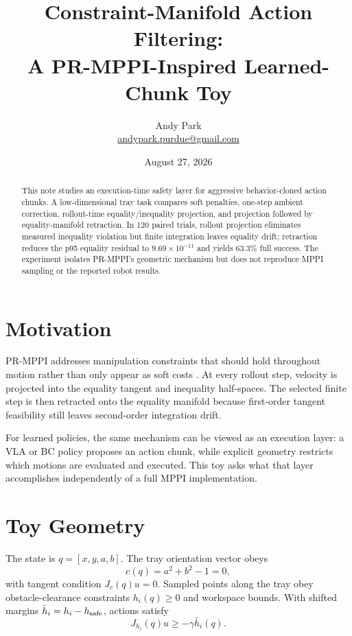 \documentclass[11pt]{article}
\title{Constraint-Manifold Action Filtering:\\A PR-MPPI-Inspired Learned-Chunk Toy}
\author{Andy Park\\\href{mailto:andypark.purdue@gmail.com}{andypark.purdue@gmail.com}}
\date{August 27, 2026}
\begin{document}
\maketitle
\begin{abstract}
This note studies an execution-time safety layer for aggressive behavior-cloned action chunks. A low-dimensional tray task compares soft penalties, one-step ambient correction, rollout-time equality/inequality projection, and projection followed by equality-manifold retraction. In 120 paired trials, rollout projection eliminates measured inequality violation but finite integration leaves equality drift; retraction reduces the p95 equality residual to $9.69\times10^{-11}$ and yields 63.3\% full success. The experiment isolates PR-MPPI's geometric mechanism but does not reproduce MPPI sampling or the reported robot results.
\end{abstract}

\section{Motivation}
PR-MPPI addresses manipulation constraints that should hold throughout motion rather than only appear as soft costs \cite{prmppi}. At every rollout step, velocity is projected into the equality tangent and inequality half-spaces. The selected finite step is then retracted onto the equality manifold because first-order tangent feasibility still leaves second-order integration drift.

For learned policies, the same mechanism can be viewed as an execution layer: a VLA or BC policy proposes an action chunk, while explicit geometry restricts which motions are evaluated and executed. This toy asks what that layer accomplishes independently of a full MPPI implementation.

\section{Toy Geometry}
The state is $q=[x,y,a,b]$. The tray orientation vector obeys
\begin{equation}
c(q)=a^2+b^2-1=0,
\end{equation}
with tangent condition $J_c(q)u=0$. Sampled points along the tray obey obstacle-clearance constraints $h_i(q)\ge0$ and workspace bounds. With shifted margins $\bar h_i=h_i-h_{\rm safe}$, actions satisfy
\begin{equation}
J_{h_i}(q)u\ge-\gamma\bar h_i(q).
\end{equation}
\end{document}
